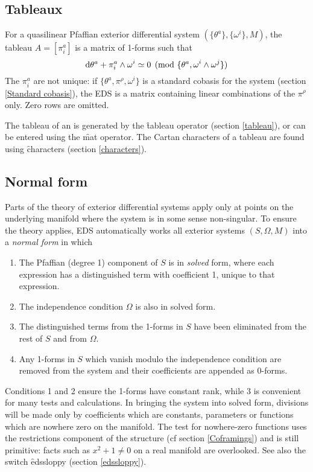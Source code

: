 \subsection{Tableaux}
\label{Tableaux}

For a quasilinear Pfaffian exterior differential system
$(\{\theta^a\},\{\omega^i\},M)$, the tableau $A=[\pi^a_i]$
is a matrix of 1-forms such that
$$	{\rm d} \theta^a + \pi^a_i\wedge\omega^i \simeq 0 
		\pmod{\{\theta^a,\omega^i\wedge\omega^j\}}
$$
The $\pi^a_i$ are not unique: if $\{\theta^a,\pi^\rho,\omega^i\}$ is a
standard cobasis for the system (section \ref{Standard cobasis}), the EDS
 is a matrix containing linear combinations of the $\pi^\rho$
only. Zero rows are omitted.

The tableau of an  is generated by the \f{tableau} operator
(section \ref{tableau}), or can be entered using the \f{mat} operator. The
Cartan characters of a tableau are found using \f{characters} (section
\ref{characters}).

\subsection{Normal form}
\label{Normal form}

Parts of the theory of exterior differential systems apply only at points
on the underlying manifold where the system is in some sense
non-singular. To ensure the theory applies, EDS automatically works all
exterior systems $(S,\Omega,M)$ into a {\em normal form} in which

\begin{enumerate}
\item The Pfaffian (degree 1) component of $S$ is in {\em solved} form,
      where each expression has a distinguished term with coefficient 1,
      unique to that expression.
\item The independence condition $\Omega$ is also in solved form.
\item The distinguished terms from the 1-forms in $S$ have been eliminated
      from the rest of $S$ and from $\Omega$.
\item Any 1-forms in $S$ which vanish modulo the independence condition are
      removed from the system and their coefficients are appended as
      0-forms.
\end{enumerate}

Conditions 1 and 2 ensure the 1-forms have constant rank, while 3 is
convenient for many tests and calculations. In bringing the system into
solved form, divisions will be made only by coefficients which are
constants, parameters or functions which are nowhere zero on the
manifold. The test for nowhere-zero functions uses the restrictions
component of the  structure (cf section \ref{Coframings}) and
is still primitive: facts such as $x^2+1\neq0$ on a real manifold are
overlooked. See also the switch \f{edssloppy} (section \ref{edssloppy}).

